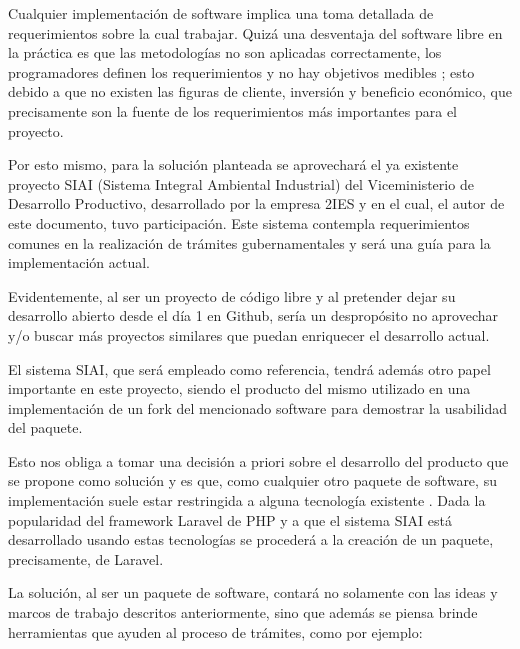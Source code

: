 Cualquier implementación de software implica una toma detallada de
requerimientos sobre la cual trabajar. Quizá una desventaja del software libre
en la práctica es que las metodologías no son aplicadas correctamente, los
programadores definen los requerimientos y no hay objetivos medibles
\cite[Tabla~1]{aberdourAchievingQualityOpenSource2007}; esto debido a que no
existen las figuras de cliente, inversión y beneficio económico, que
precisamente son la fuente de los requerimientos más importantes para el
proyecto.

Por esto mismo, para la solución planteada se aprovechará el ya existente
proyecto SIAI (Sistema Integral Ambiental Industrial) del Viceministerio de
Desarrollo Productivo, desarrollado por la empresa 2IES y en el cual, el autor
de este documento, tuvo participación. Este sistema contempla requerimientos
comunes en la realización de trámites gubernamentales y será una guía para la
implementación actual.

Evidentemente, al ser un proyecto de código libre y al pretender dejar su
desarrollo abierto desde el día 1 en Github, sería un despropósito no aprovechar
y/o buscar más proyectos similares que puedan enriquecer el desarrollo actual.

El sistema SIAI, que será empleado como referencia, tendrá además otro papel
importante en este proyecto, siendo el producto del mismo utilizado en una
implementación de un fork del mencionado software para demostrar la usabilidad
del paquete.

Esto nos obliga a tomar una decisión a priori sobre el desarrollo del producto
que se propone como solución y es que, como cualquier otro paquete de software,
su implementación suele estar restringida a alguna tecnología existente
\cite[444]{sommervilleSoftwareEngineering2016}.  Dada la popularidad del
framework Laravel de PHP y a que el sistema SIAI está desarrollado usando estas
tecnologías se procederá a la creación de un paquete, precisamente, de Laravel.

La solución, al ser un paquete de software, contará no solamente con las ideas y
marcos de trabajo descritos anteriormente, sino que además se piensa brinde
herramientas que ayuden al proceso de trámites, como por ejemplo:

